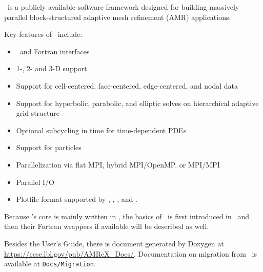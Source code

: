 \amrex\ is a publicly available software framework designed for
building massively parallel block-structured adaptive mesh refinement
(AMR) applications.

Key features of \amrex\ include:
\begin{itemize}
\item \cpp\ and Fortran interfaces
\item 1-, 2- and 3-D support
\item Support for cell-centered, face-centered, edge-centered, and
  nodal data
\item Support for hyperbolic, parabolic, and elliptic solves on
  hierarchical adaptive grid structure
\item Optional subcycling in time for time-dependent PDEs
\item Support for particles
\item Parallelization via flat MPI, hybrid MPI/OpenMP, or MPI/MPI
\item Parallel I/O
\item Plotfile format supported by \amrvis, \visit, \paraview, and \yt.
\end{itemize}

Because \amrex's core is mainly written in \cpp, the basics of \amrex\
is first introduced in \cpp\ and then their Fortran wrappers if
available will be described as well.  

Besides the User's Guide, there is document generated by Doxygen at
\url{https://ccse.lbl.gov/pub/AMReX_Docs/}.  Documentation on
migration from \boxlib\ is available at {\tt Docs/Migration}.
